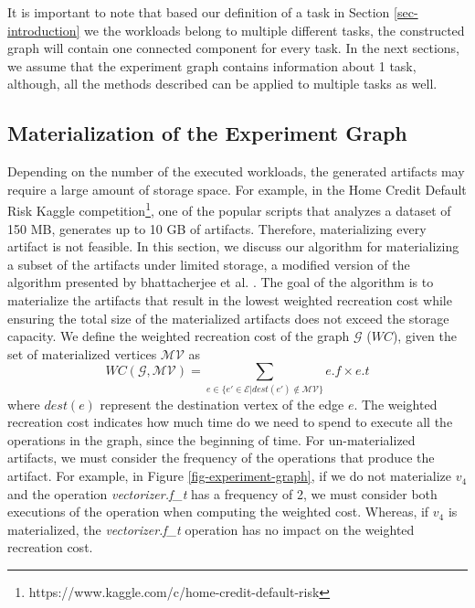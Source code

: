 It is important to note that based our definition of a task in Section \ref{sec-introduction} we the workloads belong to multiple different tasks, the constructed graph will contain one connected component for every task.
In the next sections, we assume that the experiment graph contains information about 1 task, although, all the methods described can be applied to multiple tasks as well.

\subsection{Materialization of the Experiment Graph}\label{subsec-materialization}
Depending on the number of the executed workloads, the generated artifacts may require a large amount of storage space.
For example, in the Home Credit Default Risk Kaggle competition\footnote{https://www.kaggle.com/c/home-credit-default-risk}, one of the popular scripts that analyzes a dataset of 150 MB, generates up to 10 GB of artifacts.
Therefore, materializing every artifact is not feasible.
In this section, we discuss our algorithm for materializing a subset of the artifacts under limited storage, a modified version of the algorithm presented by bhattacherjee et al. \cite{bhattacherjee2015principles}.
The goal of the algorithm is to materialize the artifacts that result in the lowest weighted recreation cost while ensuring the total size of the materialized artifacts does not exceed the storage capacity.
We define the weighted recreation cost of the graph $\mathcal{G}$ ($WC$), given the set of materialized vertices $\mathcal{MV}$ as 
\[
WC(\mathcal{G}, \mathcal{MV}) =  \sum\limits_{e \in \{e' \in \mathcal{E}  \lvert dest(e') \notin \mathcal{MV}\}}  e.f \times e.t
\]
where $dest(e)$ represent the destination vertex of the edge $e$.
The weighted recreation cost indicates how much time do we need to spend to execute all the operations in the graph, since the beginning of time.
For un-materialized artifacts, we must consider the frequency of the operations that produce the artifact.
For example, in Figure \ref{fig-experiment-graph}, if we do not materialize $v_4$ and the operation \textit{vectorizer.f\_t} has a frequency of 2, we must consider both executions of the operation when computing the weighted cost.
Whereas, if $v_4$ is materialized, the \textit{vectorizer.f\_t} operation has no impact on the weighted recreation cost.

